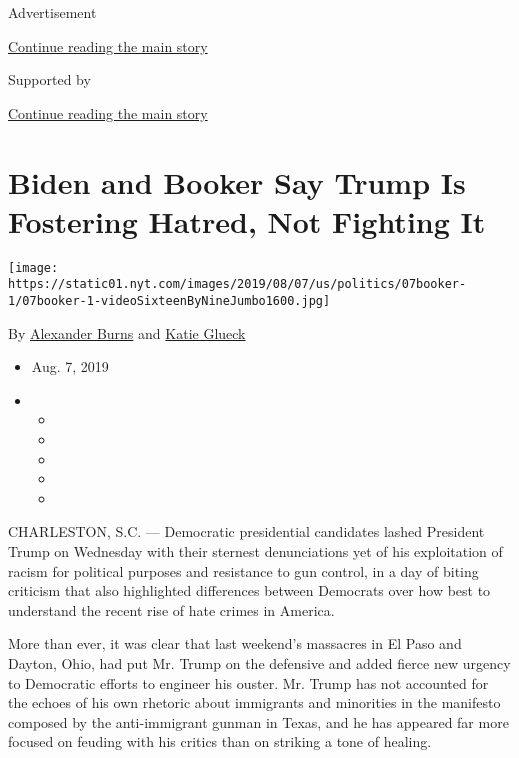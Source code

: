 Advertisement

\protect\hyperlink{after-top}{Continue reading the main story}

Supported by

\protect\hyperlink{after-sponsor}{Continue reading the main story}

\hypertarget{biden-and-booker-say-trump-is-fostering-hatred-not-fighting-it}{%
\section{Biden and Booker Say Trump Is Fostering Hatred, Not Fighting
It}\label{biden-and-booker-say-trump-is-fostering-hatred-not-fighting-it}}

\texttt{[image: https://static01.nyt.com/images/2019/08/07/us/politics/07booker-1/07booker-1-videoSixteenByNineJumbo1600.jpg]}

By \href{https://www.nytimes.com/by/alexander-burns}{Alexander Burns}
and \href{https://www.nytimes.com/by/katie-glueck}{Katie Glueck}

\begin{itemize}
\item
  Aug. 7, 2019
\item
  \begin{itemize}
  \item
  \item
  \item
  \item
  \item
  \end{itemize}
\end{itemize}

CHARLESTON, S.C. --- Democratic presidential candidates lashed President
Trump on Wednesday with their sternest denunciations yet of his
exploitation of racism for political purposes and resistance to gun
control, in a day of biting criticism that also highlighted differences
between Democrats over how best to understand the recent rise of hate
crimes in America.

More than ever, it was clear that last weekend's massacres in El Paso
and Dayton, Ohio, had put Mr. Trump on the defensive and added fierce
new urgency to Democratic efforts to engineer his ouster. Mr. Trump has
not accounted for the echoes of his own rhetoric about immigrants and
minorities in the manifesto composed by the anti-immigrant gunman in
Texas, and he has appeared far more focused on feuding with his critics
than on striking a tone of healing.

